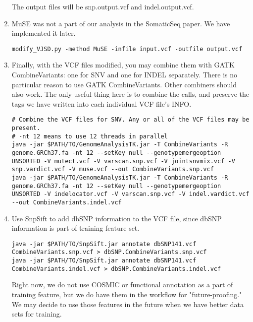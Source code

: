 \documentclass[10pt,letterpaper]{article}
\begin{document}
\begin{sloppypar}
\begin{enumerate}
The output files will be snp.output.vcf and indel.output.vcf. 


\item
MuSE was not a part of our analysis in the SomaticSeq paper. We have implemented it later. 
	
\begin{lstlisting}
modify_VJSD.py -method MuSE -infile input.vcf -outfile output.vcf
\end{lstlisting}

\item
Finally, with the VCF files modified, you may combine them with GATK CombineVariants: one for SNV and one for INDEL separately. There is no particular reason to use GATK CombineVariants. Other combiners should also work. The only useful thing here is to combine the calls, and preserve the tags we have written into each individual VCF file's INFO. 
	
\begin{lstlisting}
# Combine the VCF files for SNV. Any or all of the VCF files may be present.
# -nt 12 means to use 12 threads in parallel
java -jar $PATH/TO/GenomeAnalysisTK.jar -T CombineVariants -R genome.GRCh37.fa -nt 12 --setKey null --genotypemergeoption UNSORTED -V mutect.vcf -V varscan.snp.vcf -V jointsnvmix.vcf -V snp.vardict.vcf -V muse.vcf --out CombineVariants.snp.vcf
java -jar $PATH/TO/GenomeAnalysisTK.jar -T CombineVariants -R genome.GRCh37.fa -nt 12 --setKey null --genotypemergeoption UNSORTED -V indelocator.vcf -V varscan.snp.vcf -V indel.vardict.vcf --out CombineVariants.indel.vcf
\end{lstlisting}
	
	
\item
Use SnpSift to add dbSNP information to the VCF file, since dbSNP information is part of training feature set.
	
\begin{lstlisting}
java -jar $PATH/TO/SnpSift.jar annotate dbSNP141.vcf CombineVariants.snp.vcf > dbSNP.CombineVariants.snp.vcf
java -jar $PATH/TO/SnpSift.jar annotate dbSNP141.vcf CombineVariants.indel.vcf > dbSNP.CombineVariants.indel.vcf
\end{lstlisting}
	
Right now, we do not use COSMIC or functional annotation as a part of training feature, but we do have them in the workflow for "future-proofing." We may decide to use those features in the future when we have better data sets for training. 
	

\end{enumerate}
\end{sloppypar}
\end{document}
